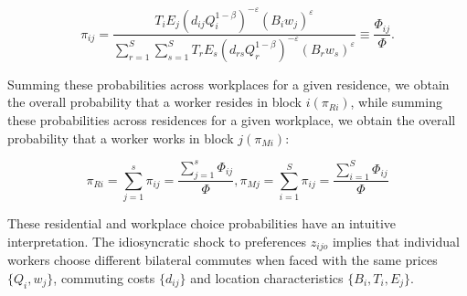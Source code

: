 \begin{equation}
    \pi_{ij} = \frac{T_i E_j(d_{ij} Q_i^{1 - \beta})^{-\varepsilon} (B_i w_j)^{\varepsilon}}{\sum_{r=1}^S \sum_{s=1}^S T_r E_s(d_{rs}Q_r^{1 - \beta})^{-\varepsilon} (B_r w_s)^{\varepsilon}} \equiv \frac{\Phi_{ij}}{\Phi}.
\end{equation}

Summing these probabilities across workplaces for a given residence, we obtain the overall probability that a worker resides in block $i(\pi_{Ri})$, while summing these probabilities across residences for a given workplace, we obtain the overall probability that a worker works in block $j(\pi_{Mi})$:

\begin{equation}
    \pi_{Ri} = \sum_{j=1}^s \pi_{ij} = \frac{\sum_{j=1}^s \Phi_{ij}}{\Phi}, \pi_{Mj} = \sum_{i=1}^S \pi_{ij} = \frac{\sum_{i=1}^S \Phi_{ij}}{\Phi}
\end{equation}

These residential and workplace choice probabilities have an intuitive interpretation. The idiosyncratic shock to preferences $z_{ijo}$ implies that individual workers choose different bilateral commutes when faced with the same prices $\{Q_i, w_j\}$, commuting costs $\{d_{ij}\}$ and location characteristics $\{B_i, T_i, E_j\}$.
